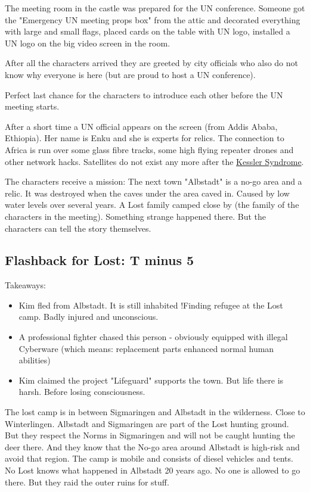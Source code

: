 The meeting room in the castle was prepared for the UN conference. Someone got the "Emergency UN meeting props box" from the attic and decorated everything with large and small flags, placed cards on the table with UN logo, installed a UN logo on the big video screen in the room.

After all the characters arrived they are greeted by city officials who also do not know why everyone is here (but are proud to host a UN conference).

Perfect last chance for the characters to introduce each other before the UN meeting starts.

After a short time a UN official appears on the screen (from Addis Ababa, Ethiopia). Her name is Enku and she is experts for relics.
The connection to Africa is run over some glass fibre tracks, some high flying repeater drones and other network hacks. Satellites do not exist any more after the \hyperref[sec: Kessler Syndrome]{Kessler Syndrome}.

The characters receive a mission:
The next town "Albstadt" is a no-go area and a relic. It was destroyed when the caves under the area caved in. Caused by low water levels over several years. A Lost family camped close by (the family of the characters in the meeting). Something strange happened there. But the characters can tell the story themselves.


\subsection{Flashback for Lost: T minus 5}

Takeaways:

\begin{itemize}
    \item Kim fled from Albstadt. It is still inhabited !Finding refugee at the Lost camp. Badly injured and unconscious.
    \item A professional fighter chased this person - obviously equipped with illegal Cyberware (which means: replacement parts enhanced normal human abilities)
    \item Kim claimed the project "Lifeguard" supports the town. But life there is harsh. Before losing consciousness.
\end{itemize}


The lost camp is in between Sigmaringen and Albstadt in the wilderness. Close to Winterlingen. Albstadt and Sigmaringen are part of the Lost hunting ground. But they respect the Norms in Sigmaringen and will not be caught hunting the deer there. And they know that the No-go area around Albstadt is high-risk and avoid that region. The camp is mobile and consists of diesel vehicles and tents. No Lost knows what happened in Albstadt 20 years ago. No one is allowed to go there. But they raid the outer ruins for stuff.

